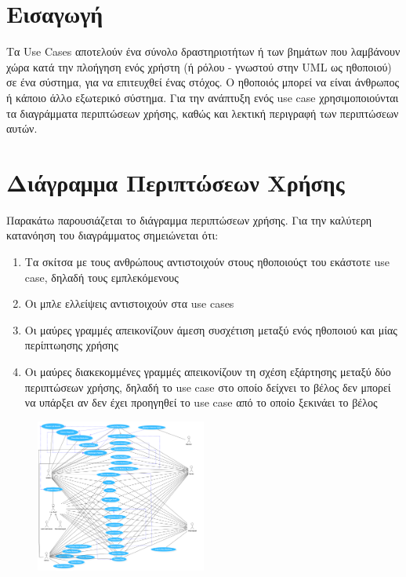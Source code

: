 \documentclass{article}
\begin{document}
{
  \hypersetup{linkcolor=black}
  \tableofcontents
}

\section{Εισαγωγή}

Τα Use Cases αποτελούν ένα σύνολο δραστηριοτήτων ή των βημάτων που λαμβάνουν χώρα κατά την πλοήγηση ενός χρήστη (ή ρόλου - γνωστού στην UML ως ηθοποιού) σε ένα σύστημα, για να επιτευχθεί ένας στόχος. Ο ηθοποιός μπορεί να είναι άνθρωπος ή κάποιο άλλο εξωτερικό σύστημα. 
Για την ανάπτυξη ενός use case χρησιμοποιούνται τα διαγράμματα περιπτώσεων χρήσης, καθώς και λεκτική περιγραφή των περιπτώσεων αυτών.

\section{Διάγραμμα Περιπτώσεων Χρήσης}

Παρακάτω παρουσιάζεται το διάγραμμα περιπτώσεων χρήσης. Για την καλύτερη κατανόηση του διαγράμματος σημειώνεται ότι:

\begin{enumerate}
  \item Τα σκίτσα με τους ανθρώπους αντιστοιχούν στους ηθοποιούςτ του εκάστοτε use case, δηλαδή τους εμπλεκόμενους
  \item Οι μπλε ελλείψεις αντιστοιχούν στα use cases
  \item Οι μαύρες γραμμές απεικονίζουν άμεση συσχέτιση μεταξύ ενός ηθοποιού και μίας περίπτωησης χρήσης
  \item Οι μαύρες διακεκομμένες γραμμές απεικονίζουν τη σχέση εξάρτησης μεταξύ δύο περιπτώσεων χρήσης, δηλαδή το use case στο οποίο δείχνει το βέλος δεν μπορεί να υπάρξει αν δεν έχει προηγηθεί το use case από το οποίο ξεκινάει το βέλος  
\end{enumerate}


\newpage
\begin{figure}[!htb]
        \centering
        \includegraphics[width=0.5\textwidth]{UML.png}
        \end{figure}
        
\end{document}
